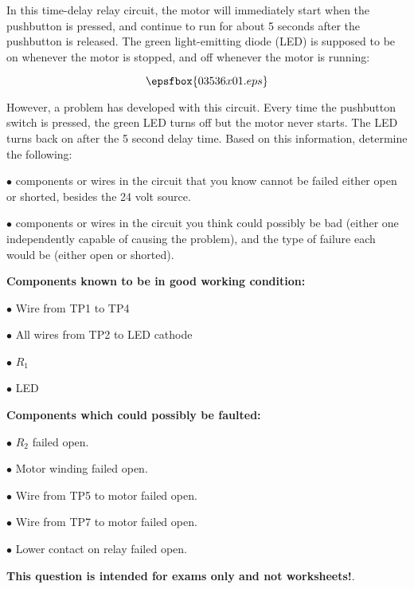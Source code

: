 

In this time-delay relay circuit, the motor will immediately start when the pushbutton is pressed, and continue to run for about 5 seconds after the pushbutton is released.  The green light-emitting diode (LED) is supposed to be on whenever the motor is stopped, and off whenever the motor is running:

$$\epsfbox{03536x01.eps}$$

However, a problem has developed with this circuit.  Every time the pushbutton switch is pressed, the green LED turns off but the motor never starts.  The LED turns back on after the 5 second delay time.  Based on this information, determine the following:

\vskip 10pt

\medskip
\item{$\bullet$}  components or wires in the circuit that you know cannot be failed either open or shorted, besides the 24 volt source.
\vskip 40pt
\item{$\bullet$}  components or wires in the circuit you think could possibly be bad (either one independently capable of causing the problem), and the type of failure each would be (either open or shorted).
\medskip







\goodbreak
\noindent
{\bf Components known to be in good working condition:}

\medskip
\item{$\bullet$} Wire from TP1 to TP4
\item{$\bullet$} All wires from TP2 to LED cathode
\item{$\bullet$} $R_1$
\item{$\bullet$} LED
\medskip

\vskip 10pt

\goodbreak
\noindent
{\bf Components which could possibly be faulted:}

\medskip
\item{$\bullet$} $R_2$ failed open.
\item{$\bullet$} Motor winding failed open.
\item{$\bullet$} Wire from TP5 to motor failed open.
\item{$\bullet$} Wire from TP7 to motor failed open.
\item{$\bullet$} Lower contact on relay failed open.
\medskip







{\bf This question is intended for exams only and not worksheets!}.



